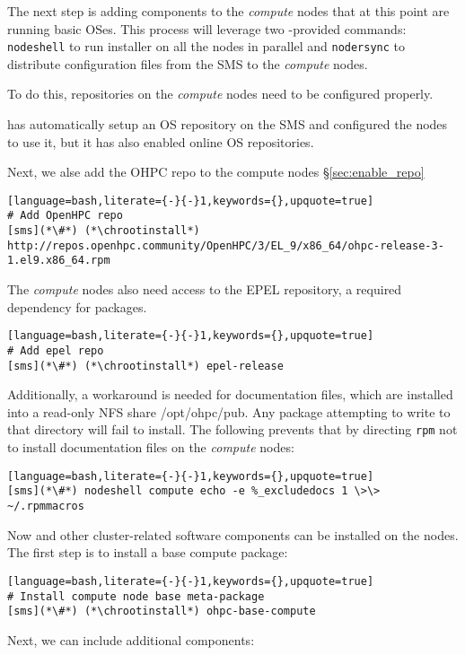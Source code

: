 
The next step is adding \OHPC{} components to the {\em compute} nodes that at this
point are running basic OSes.  This process will leverage two \Confluent{}-provided
commands: \texttt{nodeshell} to run \texttt{\pkgmgr{}} installer on all the
nodes in parallel  and \texttt{nodersync} to distribute configuration files from the
SMS to the {\em compute} nodes.

\noindent To do this, repositories on the {\em compute} nodes need to be configured
properly.

\Confluent{} has automatically setup an  OS repository on the SMS and configured the
nodes to use it, but it has  also enabled online OS repositories.


\noindent Next, we alse add the OHPC repo to the compute nodes \S\ref{sec:enable_repo}

\begin{lstlisting}[language=bash,literate={-}{-}1,keywords={},upquote=true]
# Add OpenHPC repo 
[sms](*\#*) (*\chrootinstall*) http://repos.openhpc.community/OpenHPC/3/EL_9/x86_64/ohpc-release-3-1.el9.x86_64.rpm
\end{lstlisting}

The {\em compute} nodes also need access to the EPEL repository, a required
dependency for \OHPC{} packages. 

\begin{lstlisting}[language=bash,literate={-}{-}1,keywords={},upquote=true]
# Add epel repo
[sms](*\#*) (*\chrootinstall*) epel-release

\end{lstlisting}


\noindent Additionally, a workaround is needed for \OHPC{} documentation files,
which are installed into a read-only NFS share /opt/ohpc/pub. Any package
attempting to write to that directory will fail to install. The following
prevents that by directing \texttt{rpm} not to install documentation files on
the {\em compute} nodes:

\begin{lstlisting}[language=bash,literate={-}{-}1,keywords={},upquote=true]
[sms](*\#*) nodeshell compute echo -e %_excludedocs 1 \>\> ~/.rpmmacros
\end{lstlisting}

\noindent Now \OHPC{} and other cluster-related software components can be
installed on the nodes. The first step is to install a base compute package:
\begin{lstlisting}[language=bash,literate={-}{-}1,keywords={},upquote=true]
# Install compute node base meta-package
[sms](*\#*) (*\chrootinstall*) ohpc-base-compute
\end{lstlisting}

\noindent Next, we can include additional components:
